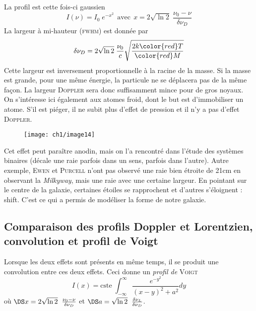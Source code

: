 La profil est cette fois-ci gaussien
\begin{equation}
I(\nu) =  I_0 \; e^{-x^2}~~\mbox{avec}~~
x = 2 \sqrt{\ln 2} \; \frac{\nu_0 - \nu}{\delta \nu_D}
\end{equation}
La largeur à mi-hauteur (\textsc{fwhm}) est donnée par
\begin{equation}
\delta \nu_D = 
2 \sqrt{\ln 2} \; \frac{\nu_0}{c} 
 \sqrt {\frac{2 k{\color{red} T}}
{ {\color{red} M} }}
\end{equation}
Cette largeur est inversement proportionnelle à la racine de la masse. Si la masse est grande, pour
une même énergie, la particule ne se déplacera pas de la même façon. La largeur \textsc{Doppler} sera
donc suffisamment mince pour de gros noyaux. On s'intéresse ici également aux atomes froid, dont le
but est d'immobiliser un atome. S'il est piéger, il ne subit plus d'effet de pression et il n'y a 
pas d'effet \textsc{Doppler}.\\

	\begin{wrapfigure}[8]{r}{5.7cm}
	\vspace{-5mm}
	\texttt{[image: ch1/image14]}
	\end{wrapfigure}
Cet effet peut paraître anodin, mais on l'a rencontré dans l'étude
des systèmes binaires (décale une raie parfois dans un sens, parfois dans l'autre). Autre exemple,
\textsc{Ewen} et \textsc{Purcell} n'ont pas observé une raie bien étroite de 21cm en observant la
\textit{Milkyway}, mais une raie avec une certaine largeur. En pointant sur le centre de la 
galaxie, certaines étoiles se rapprochent et d'autres s'éloignent : shift. C'est ce qui a permis de
modéliser la forme de notre galaxie.


\subsection{Comparaison des profils Doppler et Lorentzien, convolution et profil de Voigt}
Lorsque les deux effets sont présents en même temps, il se produit une convolution entre ces deux effets. Ceci donne un \textit{profil de} \textsc{Voigt}
\begin{equation}
I(x) = \mbox{cste} \; 
\int_{-\infty}^\infty 
\frac{e^{-y^2}}{(x-y)^2 + a^2} dy
\end{equation}
où $\DS x = 2 \sqrt{ \ln 2} \; \;
\frac{\nu_0 - \nu}{\delta \nu_D}$ et $\DS a =  \sqrt{ \ln 2} \; \; 
\frac{\delta \nu_L}{\delta \nu_D}$.
